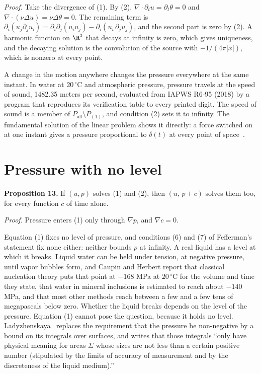 \emph{Proof.} Take the divergence of (1). By (2), $\nabla\cdot\partial_t u = \partial_t\theta = 0$ and
$\nabla\cdot(\nu\Delta u) = \nu\Delta\theta = 0$. The remaining term is
$\partial_i(u_j\partial_j u_i) = \partial_i\partial_j(u_iu_j) - \partial_i(u_i\,\partial_j u_j)$,
and the second part is zero by (2). A harmonic function on $\R^3$ that decays at infinity is zero,
which gives uniqueness, and the decaying solution is the convolution of the source with
$-1/(4\pi|x|)$, which is nonzero at every point. \hfill\qedsymbol

A change in the motion anywhere changes the pressure everywhere at the same instant. In water at
$20\,^\circ$C and atmospheric pressure, pressure travels at the speed of sound, 1482.35 meters per
second, evaluated from IAPWS R6-95 (2018) by a program that reproduces its
verification table to every printed digit. The speed of sound is a member of
$P_{\mathrm{all}}\setminus P_{(1)}$, and condition (2) sets it to infinity. The fundamental
solution of the linear problem shows it directly: a force switched on at one instant gives a
pressure proportional to $\delta(t)$ at every point of space~\cite{src:Ladyzhenskaya-1969}.

\section{Pressure with no level}

\textbf{Proposition 13.} If $(u,p)$ solves (1) and (2), then $(u,\,p+c)$ solves them too, for every function $c$
of time alone.

\emph{Proof.} Pressure enters (1) only through $\nabla p$, and $\nabla c = 0$. \hfill\qedsymbol

Equation (1) fixes no level of pressure, and conditions (6) and (7) of Fefferman's statement fix
none either: neither bounds $p$ at infinity. A real liquid has a level at which it breaks. Liquid
water can be held under tension, at negative pressure, until vapor bubbles form, and Caupin and
Herbert report that classical nucleation theory puts that point at $-168$ MPa at $20\,^\circ$C for
the volume and time they state, that water in mineral inclusions is estimated to reach about
$-140$ MPa, and that most other methods reach between a few and a few tens of megapascals below
zero. Whether the liquid breaks depends on the level of the pressure. Equation (1) cannot pose the
question, because it holds no level. Ladyzhenskaya~\cite{src:Ladyzhenskaya-1969} replaces the
requirement that the pressure be non-negative by a bound on its integrals over surfaces, and writes
that those integrals ``only have physical meaning for areas $\Sigma$ whose sizes are not less than a
certain positive number (stipulated by the limits of accuracy of measurement and by the discreteness
of the liquid medium).''

